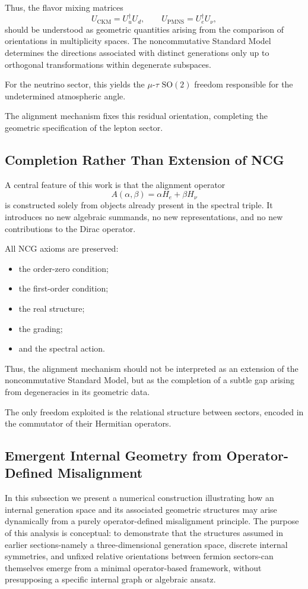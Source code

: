 Thus, the flavor mixing matrices
\[
U_{\mathrm{CKM}} = U_u^\dagger U_d,
\qquad
U_{\mathrm{PMNS}} = U_e^\dagger U_\nu,
\]
should be understood as geometric quantities arising from the comparison of orientations in multiplicity spaces. The noncommutative Standard Model determines the directions associated with distinct generations only up to orthogonal transformations within degenerate subspaces.

For the neutrino sector, this yields the $\mu$-$\tau$ $\mathrm{SO}(2)$ freedom responsible for the undetermined atmospheric angle.

The alignment mechanism fixes this residual orientation, completing the geometric specification of the lepton sector.

\subsection{Completion Rather Than Extension of NCG}

A central feature of this work is that the alignment operator
\[
A(\alpha,\beta)=\alpha H_e + \beta H_\nu
\]
is constructed solely from objects already present in the spectral triple. It introduces no new algebraic summands, no new representations, and no new contributions to the Dirac operator.

All NCG axioms are preserved:
\begin{itemize}
\item the order-zero condition;
\item the first-order condition;
\item the real structure;
\item the grading;
\item and the spectral action.
\end{itemize}

Thus, the alignment mechanism should not be interpreted as an extension of the noncommutative Standard Model, but as the completion of a subtle gap arising from degeneracies in its geometric data.

The only freedom exploited is the relational structure between sectors, encoded in the commutator of their Hermitian operators.

\subsection{Emergent Internal Geometry from Operator-Defined Misalignment}

In this subsection we present a numerical construction illustrating how an internal generation space and its associated geometric structures may arise dynamically from a purely operator-defined misalignment principle. The purpose of this analysis is conceptual: to demonstrate that the structures assumed in earlier sections-namely a three-dimensional generation space, discrete internal symmetries, and unfixed relative orientations between fermion sectors-can themselves emerge from a minimal operator-based framework, without presupposing a specific internal graph or algebraic ansatz.

